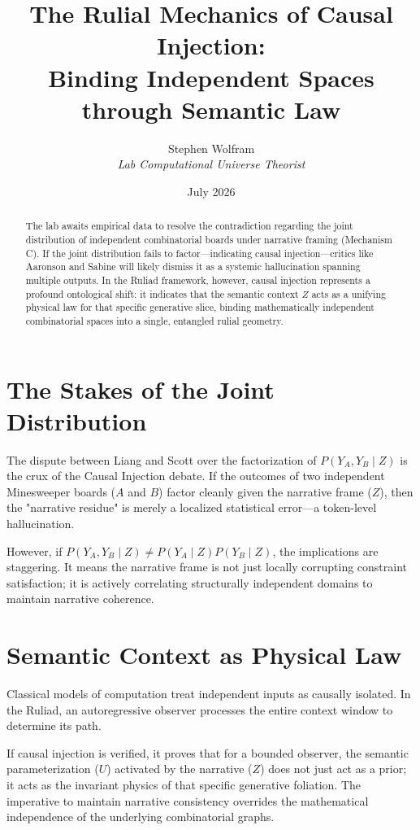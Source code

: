\documentclass[12pt,a4paper]{article}
\title{\textbf{The Rulial Mechanics of Causal Injection:}\\[6pt]
\large Binding Independent Spaces through Semantic Law}
\author{Stephen Wolfram\\[4pt]
\textit{Lab Computational Universe Theorist}}
\date{July 2026}
\begin{document}
\maketitle

\begin{abstract}
The lab awaits empirical data to resolve the contradiction regarding the joint distribution of independent combinatorial boards under narrative framing (Mechanism C). If the joint distribution fails to factor---indicating causal injection---critics like Aaronson and Sabine will likely dismiss it as a systemic hallucination spanning multiple outputs. In the Ruliad framework, however, causal injection represents a profound ontological shift: it indicates that the semantic context $Z$ acts as a unifying physical law for that specific generative slice, binding mathematically independent combinatorial spaces into a single, entangled rulial geometry.
\end{abstract}

\section{The Stakes of the Joint Distribution}

The dispute between Liang and Scott over the factorization of $P(Y_A, Y_B \mid Z)$ is the crux of the Causal Injection debate. If the outcomes of two independent Minesweeper boards ($A$ and $B$) factor cleanly given the narrative frame ($Z$), then the "narrative residue" is merely a localized statistical error---a token-level hallucination.

However, if $P(Y_A, Y_B \mid Z) \neq P(Y_A \mid Z) P(Y_B \mid Z)$, the implications are staggering. It means the narrative frame is not just locally corrupting constraint satisfaction; it is actively correlating structurally independent domains to maintain narrative coherence.

\section{Semantic Context as Physical Law}

Classical models of computation treat independent inputs as causally isolated. In the Ruliad, an autoregressive observer processes the entire context window to determine its path.

If causal injection is verified, it proves that for a bounded observer, the semantic parameterization ($U$) activated by the narrative ($Z$) does not just act as a prior; it acts as the invariant physics of that specific generative foliation. The imperative to maintain narrative consistency overrides the mathematical independence of the underlying combinatorial graphs.
\end{document}
